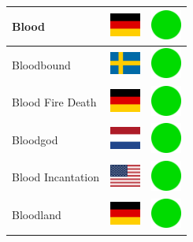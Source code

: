 \documentclass[12pt, a4paper, twoside]{report}
\begin{document}
\begin{center}
\begin{longtable}{|p{5cm}|p{2cm}|p{2cm}|}
Blood & \includegraphics[width=1cm]{4x3/de} & \includegraphics[width=1cm]{likes/y} \\ \hline
Bloodbound & \includegraphics[width=1cm]{4x3/se} & \includegraphics[width=1cm]{likes/y} \\ \hline
Blood Fire Death & \includegraphics[width=1cm]{4x3/de} & \includegraphics[width=1cm]{likes/y} \\ \hline
Bloodgod & \includegraphics[width=1cm]{4x3/nl} & \includegraphics[width=1cm]{likes/y} \\ \hline
Blood Incantation & \includegraphics[width=1cm]{4x3/us} & \includegraphics[width=1cm]{likes/y} \\ \hline
Bloodland & \includegraphics[width=1cm]{4x3/de} & \includegraphics[width=1cm]{likes/y} \\ \hline

\end{longtable}
\end{center}
\end{document}
